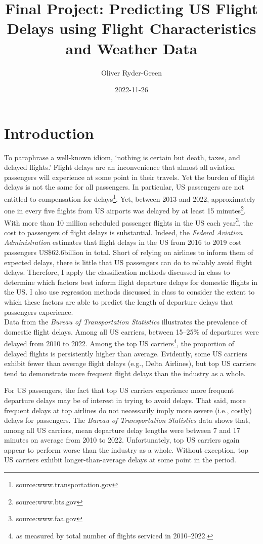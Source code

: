 \documentclass[
]{article}
\title{Final Project: Predicting US Flight Delays using Flight
Characteristics and Weather Data}
\author{Oliver Ryder-Green}
\date{2022-11-26}
\begin{document}
\maketitle

\clearpage

\section{Introduction}

To paraphrase a well-known idiom, `nothing is certain but death, taxes,
and delayed flights.' Flight delays are an inconvenience that almost all
aviation passengers will experience at some point in their travels. Yet
the burden of flight delays is not the same for all passengers. In
particular, US passengers are not entitled to compensation for
delays\footnote{source:www.transportation.gov}. Yet, between 2013 and
2022, approximately one in every five flights from US airports was
delayed by at least 15 minutes\footnote{source:www.bts.gov}. With more
than 10 million scheduled passenger flights in the US each
year\footnote{source:www.faa.gov}, the cost to passengers of flight
delays is substantial. Indeed, the
\textit{Federal Aviation Administration} estimates that flight delays in
the US from 2016 to 2019 cost passengers US\$62.6billion in total. Short
of relying on airlines to inform them of expected delays, there is
little that US passengers can do to reliably avoid flight delays.
Therefore, I apply the classification methods discussed in class to
determine which factors best inform flight departure delays for domestic
flights in the US. I also use regression methods discussed in class to
consider the extent to which these factors are able to predict the
length of departure delays that passengers experience.\\

Data from the \textit{Bureau of Transportation Statistics} illustrates
the prevalence of domestic flight delays. Among all US carriers, between
15--25\% of departures were delayed from 2010 to 2022. Among the top US
carriers\footnote{as measured by total number of flights serviced in 2010--2022.},
the proportion of delayed flights is persistently higher than average.
Evidently, some US carriers exhibit fewer than average flight delays
(e.g., Delta Airlines), but top US carriers tend to demonstrate more
frequent flight delays than the industry as a whole.

For US passengers, the fact that top US carriers experience more
frequent departure delays may be of interest in trying to avoid delays.
That said, more frequent delays at top airlines do not necessarily imply
more severe (i.e., costly) delays for passengers. The
\textit{Bureau of Transportation Statistics} data shows that, among all
US carriers, mean departure delay lengths were between 7 and 17 minutes
on average from 2010 to 2022. Unfortunately, top US carriers again
appear to perform worse than the industry as a whole. Without exception,
top US carriers exhibit longer-than-average delays at some point in the
period.
\end{document}

